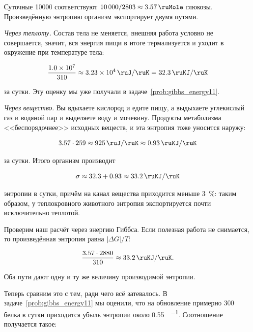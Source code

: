 Суточные \qty{10000}{\ruKJ} соответствуют $\num{10000}/\num{2803} \approx \qty{3,57}{\ruMole}$ глюкозы. Произведённую энтропию организм экспортирует двумя путями.

\emph{Через теплоту.} Состав тела не меняется, внешняя работа условно не совершается, значит, вся энергия пищи в итоге термализуется и уходит в окружение при температуре тела:

\begin{equation*}
    \frac{\num{1,0e7}}{\num{310}} \approx \num{3,23e4} \, \unit{\ruJ\per\ruK} = \qty{32,3}{\ruKJ\per\ruK}
\end{equation*}

за сутки. Эту оценку мы уже получали в задаче~\ref{prob:gibbs_energy11}.

\emph{Через вещество.} Вы вдыхаете кислород и едите пищу, а выдыхаете углекислый газ и водяной пар и выделяете воду и мочевину. Продукты метаболизма <<беспорядочнее>> исходных веществ, и эта энтропия тоже уносится наружу:

\begin{equation*}
    \num{3,57} \cdot \num{259} \approx \num{925} \, \unit{\ruJ\per\ruK} \approx \qty{0,93}{\ruKJ\per\ruK}
\end{equation*}

за сутки. Итого организм производит

\begin{equation*}
    \sigma \approx \num{32,3} + \num{0,93} \approx \qty{33,2}{\ruKJ\per\ruK}
\end{equation*}

энтропии в сутки, причём на канал вещества приходится меньше \qty{3}{\percent}: таким образом, у теплокровного животного энтропия экспортируется почти исключительно теплотой.

Проверим наш расчёт через энергию Гиббса. Если полезная работа не снимается, то произведённая энтропия равна $\left| \Delta G \right| / T$:

\begin{equation*}
    \frac{\num{3,57} \cdot \num{2880}}{\num{310}} \approx \qty{33,2}{\ruKJ\per\ruK}.
\end{equation*}

Оба пути дают одну и ту же величину производимой энтропии.

Теперь сравним это с тем, ради чего всё затевалось. В задаче~\ref{prob:gibbs_energy11} мы оценили, что на обновление примерно \qty{300}{\ruG} белка в сутки приходится убыль энтропии около \qty{0,55}{\ruKJ\per\ruK}. Соотношение получается такое:

